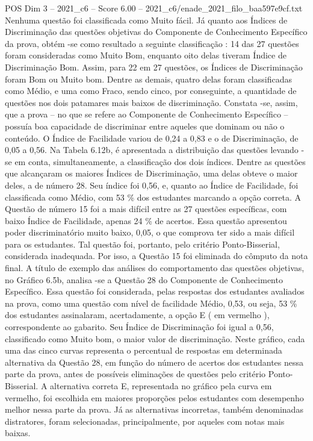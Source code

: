 \begin{textsample}{POS Dim 3 – 2021\_c6 – Score 6.00 – 2021\_c6/enade\_2021\_filo\_baa597e9cf.txt}
Nenhuma questão foi classificada como Muito fácil.
Já quanto aos Índices de Discriminação das questões objetivas do Componente de Conhecimento Específico da prova, obtém -se como resultado a seguinte classificação : 14 das 27 questões foram consideradas como Muito Bom, enquanto oito delas tiveram Índice de Discriminação Bom.
Assim, para 22 em 27 questões, os Índices de Discriminação foram Bom ou Muito bom.
Dentre as demais, quatro delas foram classificadas como Médio, e uma como Fraco, sendo cinco, por conseguinte, a quantidade de questões nos dois patamares mais baixos de discriminação.
Constata -se, assim, que a prova – no que se refere ao Componente de Conhecimento Específico – possuía boa capacidade de discriminar entre aqueles que dominam ou não o conteúdo.
O Índice de Facilidade variou de 0,24 a 0,83 e o de Discriminação, de 0,05 a 0,56.
Na Tabela 6.12b, é apresentada a distribuição das questões levando -se em conta, simultaneamente, a classificação dos dois índices.
Dentre as questões que alcançaram os maiores Índices de Discriminação, uma delas obteve o maior deles, a de número 28.
Seu índice foi 0,56, e, quanto ao Índice de Facilidade, foi classificada como Médio, com 53 \% dos estudantes marcando a opção correta.
A Questão de número 15 foi a mais difícil entre as 27 questões específicas, com baixo Índice de Facilidade, apenas 24 \% de acertos.
Essa questão apresentou poder discriminatório muito baixo, 0,05, o que comprova ter sido a mais difícil para os estudantes.
Tal questão foi, portanto, pelo critério Ponto-Bisserial, considerada inadequada.
Por isso, a Questão 15 foi eliminada do cômputo da nota final.
A título de exemplo das análises do comportamento das questões objetivas, no Gráfico 6.5b, analisa -se a Questão 28 do Componente de Conhecimento Específico.
Essa questão foi considerada, pelas respostas dos estudantes avaliados na prova, como uma questão com nível de facilidade Médio, 0,53, ou seja, 53 \% dos estudantes assinalaram, acertadamente, a opção E ( em vermelho ), correspondente ao gabarito.
Seu Índice de Discriminação foi igual a 0,56, classificado como Muito bom, o maior valor de discriminação.
Neste gráfico, cada uma das cinco curvas representa o percentual de respostas em determinada alternativa da Questão 28, em função do número de acertos dos estudantes nessa parte da prova, antes de possíveis eliminações de questões pelo critério Ponto-Bisserial.
A alternativa correta E, representada no gráfico pela curva em vermelho, foi escolhida em maiores proporções pelos estudantes com desempenho melhor nessa parte da prova.
Já as alternativas incorretas, também denominadas distratores, foram selecionadas, principalmente, por aqueles com notas mais baixas.

\end{textsample}
